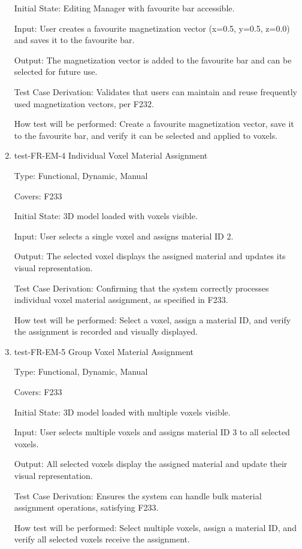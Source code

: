 \documentclass[12pt, titlepage]{article}
\begin{document}
\begin{enumerate}
Initial State: Editing Manager with favourite bar accessible.
					
Input: User creates a favourite magnetization vector (x=0.5, y=0.5, z=0.0) and saves it to the favourite bar.
					
Output: The magnetization vector is added to the favourite bar and can be selected for future use.

Test Case Derivation: Validates that users can maintain and reuse frequently used magnetization vectors, per F232.
					
How test will be performed: Create a favourite magnetization vector, save it to the favourite bar, and verify it can be selected and applied to voxels.

\item{test-FR-EM-4 Individual Voxel Material Assignment\\}

Type: Functional, Dynamic, Manual

Covers: F233
					
Initial State: 3D model loaded with voxels visible.
					
Input: User selects a single voxel and assigns material ID 2.
					
Output: The selected voxel displays the assigned material and updates its visual representation.

Test Case Derivation: Confirming that the system correctly processes individual voxel material assignment, as specified in F233.
					
How test will be performed: Select a voxel, assign a material ID, and verify the assignment is recorded and visually displayed.

\item{test-FR-EM-5 Group Voxel Material Assignment\\}

Type: Functional, Dynamic, Manual

Covers: F233
					
Initial State: 3D model loaded with multiple voxels visible.
					
Input: User selects multiple voxels and assigns material ID 3 to all selected voxels.
					
Output: All selected voxels display the assigned material and update their visual representation.

Test Case Derivation: Ensures the system can handle bulk material assignment operations, satisfying F233.
					
How test will be performed: Select multiple voxels, assign a material ID, and verify all selected voxels receive the assignment.


\end{enumerate}
\end{document}
